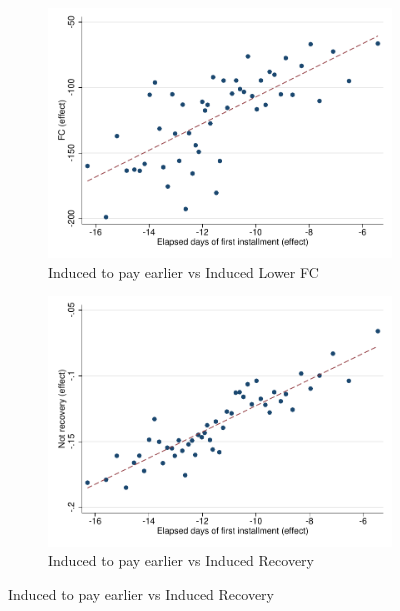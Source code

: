 \documentclass[11pt]{article}
\begin{document}
\begin{figure}[H]
    \caption{Relationship between treatment effects}
    \label{induced_to_pay_early}
    \begin{center}
    \begin{subfigure}{0.45\textwidth}
        \caption{\footnotesize{Induced to pay earlier vs Induced Lower FC}}
        \centering
        \includegraphics[width=\textwidth]{Figuras/binscatter_fc_days_pro_2.pdf}
    \end{subfigure}
        \begin{subfigure}{0.45\textwidth}
        \caption{\footnotesize{Induced to pay earlier vs Induced Recovery}}
        \centering
        \includegraphics[width=\textwidth]{Figuras/binscatter_def_days_pro_2.pdf}
    \end{subfigure}

\end{center}
\end{figure}
\end{document}
